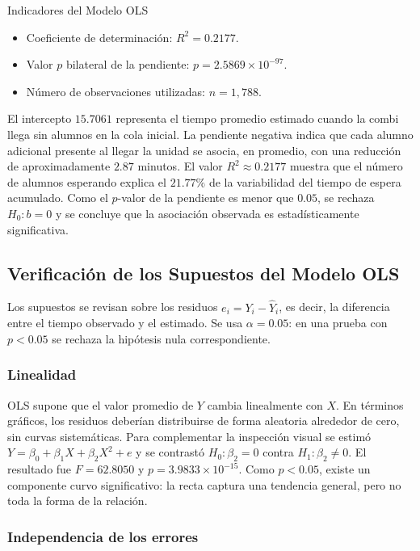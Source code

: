 \begin{statbox}{Indicadores del Modelo OLS}
    \begin{itemize}
        \item Coeficiente de determinación: $R^2=0.2177$.
        \item Valor $p$ bilateral de la pendiente: $p=2.5869\times10^{-97}$.
        \item Número de observaciones utilizadas: $n=1{,}788$.
    \end{itemize}
\end{statbox}

El intercepto $15.7061$ representa el tiempo promedio estimado cuando la combi llega
sin alumnos en la cola inicial. La pendiente
negativa indica que cada alumno adicional presente al llegar la unidad se asocia, en
promedio, con una reducción de aproximadamente $2.87$ minutos. El valor
$R^2\approx0.2177$ muestra que el número de alumnos esperando explica el
$21.77\%$ de la variabilidad del tiempo de espera acumulado. Como el $p$-valor de la pendiente es
menor que $0.05$, se rechaza $H_0:b=0$ y se concluye que la asociación observada es
estadísticamente significativa.

\subsection{Verificación de los Supuestos del Modelo OLS}

Los supuestos se revisan sobre los residuos $e_i=Y_i-\widehat{Y}_i$, es decir, la
diferencia entre el tiempo observado y el estimado. Se usa $\alpha=0.05$: en una prueba
con $p<0.05$ se rechaza la hipótesis nula correspondiente.

\subsubsection{Linealidad}

OLS supone que el valor promedio de $Y$ cambia linealmente con $X$. En términos
gráficos, los residuos deberían distribuirse de forma aleatoria alrededor de cero, sin
curvas sistemáticas. Para complementar la inspección visual se estimó
$Y=\beta_0+\beta_1X+\beta_2X^2+e$ y se contrastó $H_0:\beta_2=0$ contra
$H_1:\beta_2\neq0$. El resultado fue $F=62.8050$ y
$p=3.9833\times10^{-15}$. Como $p<0.05$, existe un componente curvo significativo: la
recta captura una tendencia general, pero no toda la forma de la relación.

\subsubsection{Independencia de los errores}

